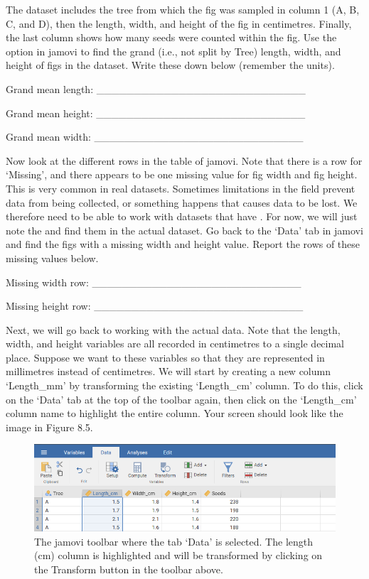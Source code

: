 \documentclass[
  openany]{krantz}
\begin{document}
The dataset includes the tree from which the fig was sampled in column 1 (A, B, C, and D), then the length, width, and height of the fig in centimetres.
Finally, the last column shows how many seeds were counted within the fig.
Use the  option in jamovi to find the grand (i.e., not split by Tree)  length, width, and height of figs in the dataset.
Write these  down below (remember the units).

Grand mean length: \_\_\_\_\_\_\_\_\_\_\_\_\_\_\_\_\_\_\_\_\_\_\_\_\_\_\_\_

Grand mean height: \_\_\_\_\_\_\_\_\_\_\_\_\_\_\_\_\_\_\_\_\_\_\_\_\_\_\_\_

Grand mean width: \_\_\_\_\_\_\_\_\_\_\_\_\_\_\_\_\_\_\_\_\_\_\_\_\_\_\_\_

Now look at the different rows in the  table of jamovi.
Note that there is a row for `Missing', and there appears to be one missing value for fig width and fig height.
This is very common in real datasets.
Sometimes  limitations in the field prevent data from being collected, or something happens that causes data to be lost.
We therefore need to be able to work with datasets that have .
For now, we will just note the  and find them in the actual dataset.
Go back to the `Data' tab in jamovi and find the figs with a missing width and height value.
Report the rows of these missing values below.

Missing width row: \_\_\_\_\_\_\_\_\_\_\_\_\_\_\_\_\_\_\_\_\_\_\_\_\_\_\_\_

Missing height row: \_\_\_\_\_\_\_\_\_\_\_\_\_\_\_\_\_\_\_\_\_\_\_\_\_\_\_\_

Next, we will go back to working with the actual data.
Note that the length, width, and height variables are all recorded in centimetres to a single decimal place.
Suppose we want to  these variables so that they are represented in millimetres instead of centimetres.
We will start by creating a new column `Length\_mm' by transforming the existing `Length\_cm' column.
To do this, click on the `Data' tab at the top of the toolbar again, then click on the `Length\_cm' column name to highlight the entire column.
Your screen should look like the image in Figure 8.5.

\begin{figure}
\includegraphics[width=1\linewidth]{img/jamovi_transform_fig_length} \caption{The jamovi toolbar where the tab `Data' is selected. The length (cm) column is highlighted and will be transformed by clicking on the Transform button in the toolbar above.}\label{fig:unnamed-chunk-30}
\end{figure}
\end{document}
